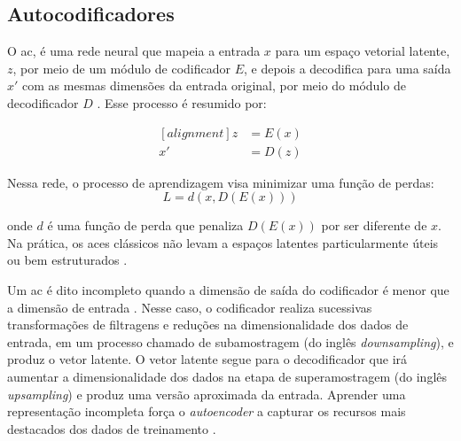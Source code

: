 
\subsection{Autocodificadores}


O \gls{ac}, é uma rede neural que mapeia a entrada $x$ para um espaço vetorial latente, $z$, por meio de um módulo de codificador $E$, e depois a decodifica para uma saída $x'$ com as mesmas dimensões da entrada original, por meio do módulo de decodificador $D$ \cite{FrancoisDeepLearning}. Esse processo é resumido por: 

\begin{equation}
\begin{aligned}[alignment]
z &= E(x)\\ 
x' &= D(z)	
\end{aligned}
\end{equation}

Nessa rede, o processo de aprendizagem visa minimizar uma função de perdas:
\begin{equation}
L = d(x,D(E(x)))
\end{equation}

onde $d$ é uma função de perda que penaliza $D(E(x))$  por ser diferente de $x$. Na prática, os \acrshort{ac}es clássicos não levam a espaços latentes particularmente úteis ou bem estruturados \cite{FrancoisDeepLearning}. 

Um \acrshort{ac} é dito incompleto quando a dimensão de saída do codificador é menor que a dimensão de entrada \cite{Goodfellow2016}. Nesse caso, o codificador realiza sucessivas transformações de filtragens e reduções na dimensionalidade dos dados de entrada, em um processo chamado de subamostragem (do inglês \textit{downsampling}), e produz o vetor latente. O vetor latente segue para o decodificador que irá aumentar a dimensionalidade dos dados na etapa de superamostragem (do inglês \textit{upsampling}) e produz uma versão aproximada da entrada. Aprender uma representação incompleta força o \textit{autoencoder}  a capturar os recursos mais destacados dos dados de treinamento \cite{Goodfellow2016}. 


